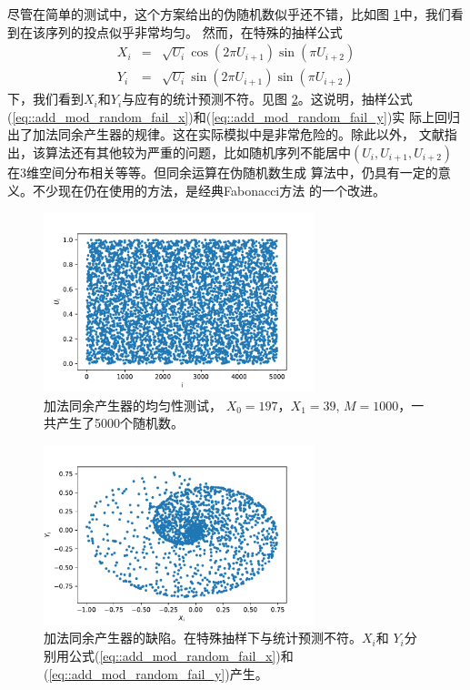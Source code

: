 尽管在简单的测试中，这个方案给出的伪随机数似乎还不错，比如图
\ref{fig::add_mod_random_test}中，我们看到在该序列的投点似乎非常均匀。
然而，在特殊的抽样公式
\begin{eqnarray}
  X_i & = & \sqrt{U_i} \cos(2 \pi U_{i + 1}) \sin(\pi U_{i + 2})
  \label{eq::add_mod_random_fail_x}\\
  Y_i & = & \sqrt{U_i} \sin(2 \pi U_{i + 1}) \sin(\pi U_{i + 2})
  \label{eq::add_mod_random_fail_y}
\end{eqnarray}
下，我们看到$X_i$和$Y_i$与应有的统计预测不符。见图
\ref{fig::add_mod_random_fail}。这说明，抽样公式
(\ref{eq::add_mod_random_fail_x})和(\ref{eq::add_mod_random_fail_y})实
际上回归出了加法同余产生器的规律。这在实际模拟中是非常危险的。除此以外，
文献指出，该算法还有其他较为严重的问题，比如随机序列不能居中$(U_i,
U_{i + 1}, U_{i + 2})$在3维空间分布相关等等。但同余运算在伪随机数生成
算法中，仍具有一定的意义。不少现在仍在使用的方法，是经典Fabonacci方法
的一个改进。

\begin{figure}[!ht]
\centering
\includegraphics[width=0.7\textwidth]{images/add_mod_random_test.pdf}
\caption{加法同余产生器的均匀性测试， $X_0 = 197$，$X_1 = 39$, $M =
  1000$，一共产生了5000个随机数。}
\label{fig::add_mod_random_test}
\end{figure}

\begin{figure}[!ht]
\centering
\includegraphics[width=0.7\textwidth]{images/add_mod_random_fail.pdf}
\caption{加法同余产生器的缺陷。在特殊抽样下与统计预测不符。$X_i$和
  $Y_i$分别用公式(\ref{eq::add_mod_random_fail_x})和
  (\ref{eq::add_mod_random_fail_y})产生。}
\label{fig::add_mod_random_fail}
\end{figure}


